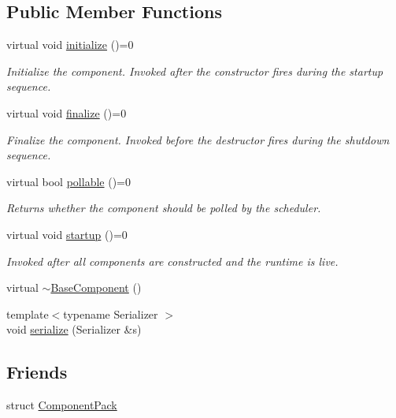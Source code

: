 \subsection*{Public Member Functions}
\begin{DoxyCompactItemize}
\item 
virtual void \hyperlink{structvt_1_1runtime_1_1component_1_1_base_component_ae361291ee8a37325580e59fb4030bc3a}{initialize} ()=0
\begin{DoxyCompactList}\small\item\em Initialize the component. Invoked after the constructor fires during the startup sequence. \end{DoxyCompactList}\item 
virtual void \hyperlink{structvt_1_1runtime_1_1component_1_1_base_component_ac03e2177ad2e26b1b8cb94c7e47e3eff}{finalize} ()=0
\begin{DoxyCompactList}\small\item\em Finalize the component. Invoked before the destructor fires during the shutdown sequence. \end{DoxyCompactList}\item 
virtual bool \hyperlink{structvt_1_1runtime_1_1component_1_1_base_component_ab651a49e6d4d3d8ca9e82a6b4b10af66}{pollable} ()=0
\begin{DoxyCompactList}\small\item\em Returns whether the component should be polled by the scheduler. \end{DoxyCompactList}\item 
virtual void \hyperlink{structvt_1_1runtime_1_1component_1_1_base_component_a8bf92f9f0a7027abf7deaefa2e7f5202}{startup} ()=0
\begin{DoxyCompactList}\small\item\em Invoked after all components are constructed and the runtime is live. \end{DoxyCompactList}\item 
virtual \hyperlink{structvt_1_1runtime_1_1component_1_1_base_component_a9190b5cb499f9cfdacc1e0bd98a1805a}{$\sim$\+Base\+Component} ()
\item 
{\footnotesize template$<$typename Serializer $>$ }\\void \hyperlink{structvt_1_1runtime_1_1component_1_1_base_component_abe85836f57c42a695fdc292cd78b10cb}{serialize} (Serializer \&s)
\end{DoxyCompactItemize}
\subsection*{Friends}
\begin{DoxyCompactItemize}
\item 
struct \hyperlink{structvt_1_1runtime_1_1component_1_1_base_component_a82123f8d3dae68c38bd13d269d00b4c5}{Component\+Pack}
\end{DoxyCompactItemize}
